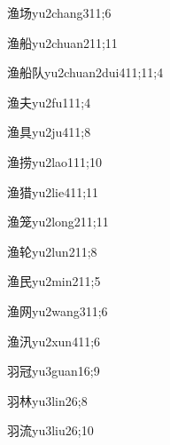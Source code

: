\begin{verbete}{渔场}{yu2chang3}{11;6}
\end{verbete}
\begin{verbete}{渔船}{yu2chuan2}{11;11}
\end{verbete}
\begin{verbete}{渔船队}{yu2chuan2dui4}{11;11;4}
\end{verbete}
\begin{verbete}{渔夫}{yu2fu1}{11;4}
\end{verbete}
\begin{verbete}{渔具}{yu2ju4}{11;8}
\end{verbete}
\begin{verbete}{渔捞}{yu2lao1}{11;10}
\end{verbete}
\begin{verbete}{渔猎}{yu2lie4}{11;11}
\end{verbete}
\begin{verbete}{渔笼}{yu2long2}{11;11}
\end{verbete}
\begin{verbete}{渔轮}{yu2lun2}{11;8}
\end{verbete}
\begin{verbete}{渔民}{yu2min2}{11;5}
\end{verbete}
\begin{verbete}{渔网}{yu2wang3}{11;6}
\end{verbete}
\begin{verbete}{渔汛}{yu2xun4}{11;6}
\end{verbete}
\begin{verbete}{羽冠}{yu3guan1}{6;9}
\end{verbete}
\begin{verbete}{羽林}{yu3lin2}{6;8}
\end{verbete}
\begin{verbete}{羽流}{yu3liu2}{6;10}
\end{verbete}
